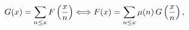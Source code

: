 \[G(x)=\sum_{n\leq x}F\left(\frac{x}{n}\right)\Longleftrightarrow F(x)=\sum_{n%
\leq x}\mathop{\mu\/}\nolimits\!\left(n\right)G\left(\frac{x}{n}\right),\]